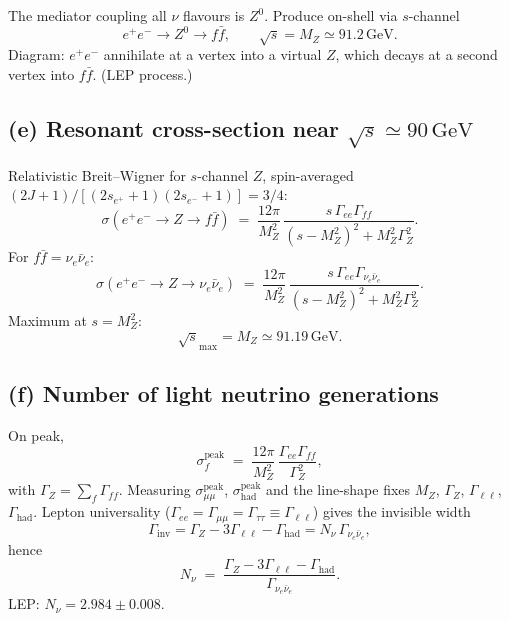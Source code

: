 \documentclass[11pt]{article}
\begin{document}
The mediator coupling all $\nu$ flavours is $Z^{0}$. Produce on-shell via $s$-channel
\[
e^{+}e^{-}\to Z^{0}\to f\bar f,\qquad\sqrt{s}=M_Z\simeq 91.2\,\text{GeV}.
\]
Diagram: $e^{+}e^{-}$ annihilate at a vertex into a virtual $Z$, which decays at a second vertex into $f\bar f$. (LEP process.)

\subsection*{(e) Resonant cross-section near $\sqrt{s}\simeq 90\,\text{GeV}$}

Relativistic Breit--Wigner for $s$-channel $Z$, spin-averaged $(2J+1)/[(2s_{e^+}{+}1)(2s_{e^-}{+}1)]=3/4$:
\begin{equation}
\sigma(e^{+}e^{-}\to Z\to f\bar f)\;=\;\frac{12\pi}{M_Z^{2}}\,\frac{s\,\Gamma_{ee}\Gamma_{ff}}{(s-M_Z^{2})^{2}+M_Z^{2}\Gamma_Z^{2}}.
\label{eq:bw-resonance}
\end{equation}
For $f\bar f=\nu_e\bar\nu_e$:
\begin{equation}
\boxed{\;\sigma(e^{+}e^{-}\to Z\to\nu_e\bar\nu_e)\;=\;\frac{12\pi}{M_Z^{2}}\,\frac{s\,\Gamma_{ee}\Gamma_{\nu_e\bar\nu_e}}{(s-M_Z^{2})^{2}+M_Z^{2}\Gamma_Z^{2}}.\;}
\end{equation}
Maximum at $s=M_Z^{2}$:
\[
\sqrt{s}_\text{max}=M_Z\simeq 91.19\,\text{GeV}.
\]

\subsection*{(f) Number of light neutrino generations}

On peak,
\begin{equation}
\sigma_f^\text{peak}\;=\;\frac{12\pi}{M_Z^{2}}\,\frac{\Gamma_{ee}\Gamma_{ff}}{\Gamma_Z^{2}},
\label{eq:peak-sigma}
\end{equation}
with $\Gamma_Z=\sum_f\Gamma_{ff}$. Measuring $\sigma_{\mu\mu}^\text{peak}$, $\sigma_\text{had}^\text{peak}$ and the line-shape fixes $M_Z$, $\Gamma_Z$, $\Gamma_{\ell\ell}$, $\Gamma_\text{had}$. Lepton universality ($\Gamma_{ee}=\Gamma_{\mu\mu}=\Gamma_{\tau\tau}\equiv\Gamma_{\ell\ell}$) gives the invisible width
\[
\Gamma_\text{inv}=\Gamma_Z-3\Gamma_{\ell\ell}-\Gamma_\text{had}=N_\nu\,\Gamma_{\nu_e\bar\nu_e},
\]
hence
\begin{equation}
\boxed{\;N_\nu\;=\;\frac{\Gamma_Z-3\Gamma_{\ell\ell}-\Gamma_\text{had}}{\Gamma_{\nu_e\bar\nu_e}}.\;}
\end{equation}
LEP: $N_\nu=2.984\pm 0.008$.
\end{document}
